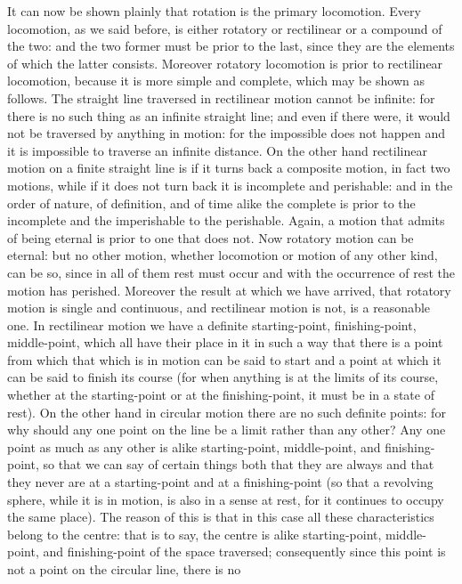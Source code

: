 It can now be shown plainly that rotation is the primary locomotion.
Every locomotion, as we said before, is either rotatory or rectilinear
or a compound of the two: and the two former must be prior to the
last, since they are the elements of which the latter consists. Moreover
rotatory locomotion is prior to rectilinear locomotion, because it
is more simple and complete, which may be shown as follows. The straight
line traversed in rectilinear motion cannot be infinite: for there
is no such thing as an infinite straight line; and even if there were,
it would not be traversed by anything in motion: for the impossible
does not happen and it is impossible to traverse an infinite distance.
On the other hand rectilinear motion on a finite straight line is
if it turns back a composite motion, in fact two motions, while if
it does not turn back it is incomplete and perishable: and in the
order of nature, of definition, and of time alike the complete is
prior to the incomplete and the imperishable to the perishable. Again,
a motion that admits of being eternal is prior to one that does not.
Now rotatory motion can be eternal: but no other motion, whether locomotion
or motion of any other kind, can be so, since in all of them rest
must occur and with the occurrence of rest the motion has perished.
Moreover the result at which we have arrived, that rotatory motion
is single and continuous, and rectilinear motion is not, is a reasonable
one. In rectilinear motion we have a definite starting-point, finishing-point,
middle-point, which all have their place in it in such a way that
there is a point from which that which is in motion can be said to
start and a point at which it can be said to finish its course (for
when anything is at the limits of its course, whether at the starting-point
or at the finishing-point, it must be in a state of rest). On the
other hand in circular motion there are no such definite points: for
why should any one point on the line be a limit rather than any other?
Any one point as much as any other is alike starting-point, middle-point,
and finishing-point, so that we can say of certain things both that
they are always and that they never are at a starting-point and at
a finishing-point (so that a revolving sphere, while it is in motion,
is also in a sense at rest, for it continues to occupy the same place).
The reason of this is that in this case all these characteristics
belong to the centre: that is to say, the centre is alike starting-point,
middle-point, and finishing-point of the space traversed; consequently
since this point is not a point on the circular line, there is no
